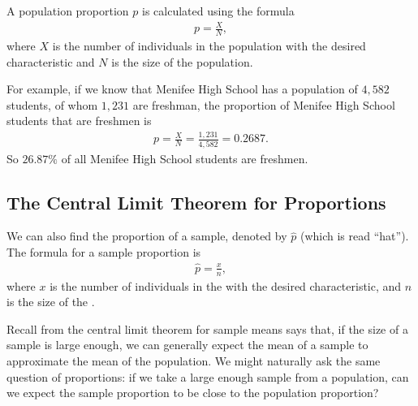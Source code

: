 \documentclass[letterpaper,10pt,english]{jupyterBook}
\begin{document}
\sphinxAtStartPar
A population proportion \(p\) is calculated using the formula
\begin{equation*}
\begin{split} p = \frac{X}{N}, \end{split}
\end{equation*}
\sphinxAtStartPar
where \(X\) is the number of individuals in the population with the desired characteristic and \(N\) is the size of the population.

\sphinxAtStartPar
For example, if we know that Menifee High School has a population of \(4{,}582\) students, of whom \(1{,}231\) are freshman, the proportion of Menifee High School students that are freshmen is
\begin{equation*}
\begin{split}p = \frac{X}{N} = \frac{1{,}231}{4{,}582} = 0.2687.\end{split}
\end{equation*}
\sphinxAtStartPar
So \(26.87\%\) of all Menifee High School students are freshmen.


\subsection{The Central Limit Theorem for Proportions}
\label{\detokenize{Ch4 The Normal Distribution and the Central Limit Theorem/4.5 The Central Limit Theorem for Proportions:id1}}
\sphinxAtStartPar
We can also find the proportion of a sample, denoted by \(\hat{p}\) (which is read “\sphinxhyphen{}hat”). The formula for a sample proportion is
\begin{equation*}
\begin{split} \hat{p} = \frac{x}{n}, \end{split}
\end{equation*}
\sphinxAtStartPar
where \(x\) is the number of individuals in the  with the desired characteristic, and \(n\) is the size of the .

\sphinxAtStartPar
Recall from the central limit theorem for sample means says that, if the size of a sample is large enough, we can generally expect the mean of a sample to approximate the mean of the population. We might naturally ask the same question of proportions: if we take a large enough sample from a population, can we expect the sample proportion to be close to the population proportion?
\end{document}
